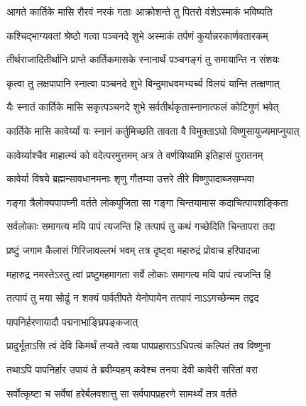 \twolineshloka
{आगते कार्तिके मासि रौरवं नरकं गताः}
{आक्रोशन्ते तु पितरो वंशेऽस्माकं भविष्यति} %

\twolineshloka
{कश्चिद्भाग्यवतां श्रेष्ठो गत्वा पञ्चनदे शुभे}
{अस्माकं तर्पणं कुर्यान्नरकार्णवतारकम्} %

\twolineshloka
{तीर्थराजादितीर्थानि प्राप्ते कार्तिकमासके}
{स्नानार्थं पञ्चगङ्गं तु समायान्ति न संशयः} %

\twolineshloka
{कृत्वा तु लक्षपापानि स्नात्वा पञ्चनदे शुभे}
{बिन्दुमाधवमभ्यर्च्य विलयं यान्ति तत्क्षणात्} %

\twolineshloka
{यैः स्नातं कार्तिके मासि सकृत्पञ्चनदे शुभे}
{सर्वतीर्थकृतास्नानात्फलं कोटिगुणं भवेत्} %


\twolineshloka
{कार्तिके मासि कावेर्य्यां यः स्नानं कर्तुमिच्छति}
{तावता वै विमुक्ताऽघो विष्णुसायुज्यमाप्नुयात्} %

\twolineshloka
{कावेर्य्याश्चैव माहात्म्यं को वदेत्परमुत्तमम्}
{अत्र ते वर्णयिष्यामि इतिहासं पुरातनम्} %

\twolineshloka
{कावेर्या विषये ब्रह्मन्सावधानमनाः शृणु}
{गौतम्या उत्तरे तीरे विष्णुपादाब्जसम्भवा} %

\twolineshloka
{गङ्गा त्रैलोक्यपापघ्नी वर्तते लोकपूजिता}
{सा गङ्गा चिन्तयामास कदाचित्पापशङ्किता} %

\twolineshloka
{सर्वलोकाः समागत्य मयि पापं त्यजन्ति हि}
{तत्पापं तु कथं गच्छेदिति चिन्तापरा तदा} %

\twolineshloka
{प्रष्टुं जगाम कैलासं गिरिजावल्लभं भवम्}
{तत्र दृष्ट्वा महारुद्रं प्रोवाच हरिपादजा} %


\twolineshloka
{महारुद्र नमस्तेऽस्तु त्वां प्रष्टुमहमागता}
{सर्वे लोकाः समागत्य मयि पापं त्यजन्ति हि} %

\twolineshloka
{तत्पापं तु मया सोढुं न शक्यं पार्वतीपते}
{येनोपायेन तत्पापं नाऽऽगच्छेन्मम तद्वद} %




\onelineshloka
{पापनिर्हरणायादौ पद्मनाभाङ्घ्रिपङ्कजात्} %

\twolineshloka
{प्रादुर्भूताऽसि त्वं देवि किमर्थं तप्यते त्वया}
{पापप्रहाराऽऽधिपत्यं कल्पितं तव विष्णुना} %

\twolineshloka
{तथाऽपि पापनिर्हार उपायं ते ब्रवीम्यहम्}
{कवेश्च तनया देवी कावेरी सरितां वरा} %

\twolineshloka
{सर्वोत्कृष्टा च सर्वेषां हरेर्बलवशात्तु सा}
{सर्वपापप्रहरणे सामर्थ्यं तत्र वर्तते} %

